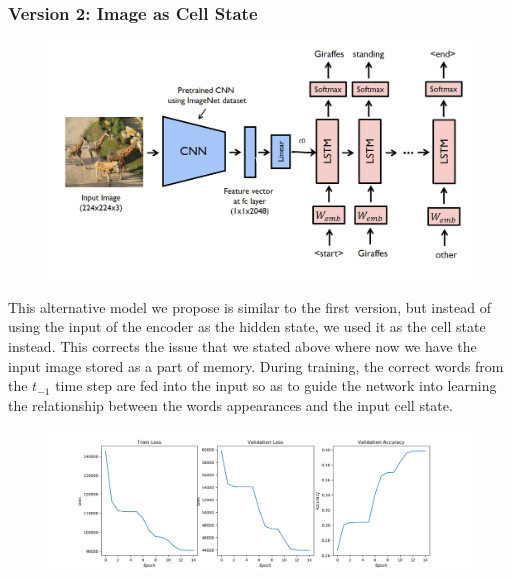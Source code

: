\documentclass{proc}
\begin{document}
\subsubsection{Version 2: Image as Cell State}
\begin{figure}[h!]
  \includegraphics[width=\linewidth]{Flow2.png}
\end{figure}
This alternative model we propose is similar to the first version, but instead of using the input of the encoder as the hidden state, we used it as the cell state instead. This corrects the issue that we stated above where now we have the input image stored as a part of memory. During training, the correct words from the $t_{-1}$ time step are fed into the input so as to guide the network into learning the relationship between the words appearances and the input cell state.
\begin{figure}[h!]
  \includegraphics[width=\linewidth]{image_as_state.png}
\end{figure}
\end{document}
